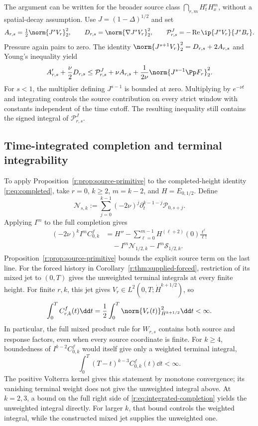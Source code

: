 The argument can be written for the broader source class
\(\bigcap_{r,m}H^r_tH^m_x\), without a spatial-decay assumption.
Use \(J=(1-\Delta)^{1/2}\) and set
\[
 A_{r,s}=\tfrac12\norm{J^sV_r}_2^2,
 \qquad D_{r,s}=\norm{\nabla J^sV_r}_2^2,
 \qquad
 \mathcal P^J_{r,s}=-\operatorname{Re}\ip{J^sV_r}{J^sB_r}.
\]
Pressure again pairs to zero. The identity
\(\norm{J^{s+1}V_r}_2^2=D_{r,s}+2A_{r,s}\)
and Young's inequality yield
\begin{equation}
 A'_{r,s}+\frac\nu2D_{r,s}
 \le\mathcal P^J_{r,s}+\nu A_{r,s}
       +\frac1{2\nu}\norm{J^{s-1}\Pp F_r}_2^2.
 \label{r:eq:inhomogeneous-source-absorption}
\end{equation}
For \(s<1\), the multiplier defining \(J^{s-1}\) is bounded at
zero. Multiplying by \(e^{-\nu t}\) and integrating controls the
source contribution on every strict window with constants independent
of the time cutoff. The resulting inequality still contains the
signed integral of \(\mathcal P^J_{r,s}\).





\subsection{Time-integrated completion and terminal integrability}

To apply Proposition~\ref{r:prop:source-primitive} to the
completed-height identity \eqref{r:eq:completed}, take
\(r=0\), \(k\ge2\), \(m=k-2\), and \(H=E_{0,1/2}\). Define
\[
 \mathcal N_{s,k}:=\sum_{j=0}^{k-1}(-2\nu)^j
 \partial_t^{k-1-j}\mathcal P_{0,s+j}.
\]
Applying \(I^m\) to the full completion gives
\begin{equation}
 \begin{aligned}
 (-2\nu)^kI^m C^f_{0,k}
 &=H''-\sum_{\ell=0}^{m-1}H^{(\ell+2)}(0)\frac{t^\ell}{\ell!}\\
 &\quad-I^m\mathcal N_{1/2,k}-I^m\mathcal S_{1/2,k}.
 \end{aligned}
 \label{r:eq:integrated-completion}
\end{equation}
Proposition~\ref{r:prop:source-primitive} bounds the explicit source term
on the last line. For the forced history in
Corollary~\ref{r:thm:supplied-forced}, restriction of its mixed jet to
\((0,T)\) gives the unweighted terminal integrals at every finite height.
For finite \(r,k\), this jet gives \(V_r\in L^2(0,T;\dot H^{k+1/2})\), so
\[
 \int_0^T C^f_{r,k}(t)\dd t
 =\frac12\int_0^T\norm{V_r(t)}_{\dot H^{k+1/2}}^2\dd t<\infty.
\]
In particular, the full mixed product rule for \(W_{r,s}\) contains both
source and response factors, even when every source coordinate is finite.
For \(k\ge4\), boundedness of \(I^{k-2}C^f_{0,k}\) would itself give
only a weighted terminal integral,
\[
 \int_0^T(T-t)^{k-3}C^f_{0,k}(t)\dd t<\infty.
\]
The positive Volterra kernel gives this statement by monotone convergence;
its vanishing terminal weight does not give the unweighted integral above.
At \(k=2,3\), a bound on the full right side of
\eqref{r:eq:integrated-completion} yields the unweighted integral directly.
For larger \(k\), that bound controls the weighted integral, while
the constructed mixed jet supplies the unweighted one.
